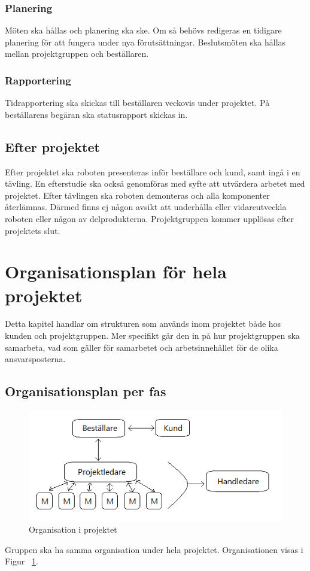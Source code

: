 \documentclass{article}
\begin{document}
\subsubsection{Planering}
Möten ska hållas och planering ska ske. Om så behövs redigeras en tidigare planering för att fungera under nya förutsättningar. Beslutsmöten ska hållas mellan projektgruppen och beställaren.

\subsubsection{Rapportering}
Tidrapportering ska skickas till beställaren veckovis under projektet. På beställarens begäran ska statusrapport skickas in.

\subsection{Efter projektet}
Efter projektet ska roboten presenteras inför beställare och kund, samt ingå i en tävling. En efterstudie ska också genomföras med syfte att utvärdera arbetet med projektet. Efter tävlingen ska roboten demonteras och alla komponenter återlämnas. Därmed finns ej någon avsikt att underhålla eller vidareutveckla roboten eller någon av delprodukterna. Projektgruppen kommer upplösas efter projektets slut.

\section{Organisationsplan för hela projektet}
Detta kapitel handlar om strukturen som används inom projektet både hos kunden och projektgruppen. Mer specifikt går den in på hur projektgruppen ska samarbeta, vad som gäller för samarbetet och arbetsinnehållet för de olika ansvarsposterna.

\subsection{Organisationsplan per fas}
\begin{figure}
\includegraphics{Organisationsplan}
\caption{Organisation i projektet}
\label{fig:organisationsplan}
\end{figure}
Gruppen ska ha samma organisation under hela projektet. Organisationen visas i Figur ~\ref{fig:organisationsplan}.
\end{document}
